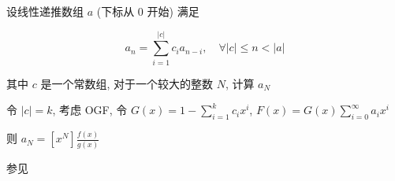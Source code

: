 设线性递推数组 \(a\) (下标从 \(0\) 开始) 满足

\[
    a_n=\sum_{i=1}^{|c|} c_i a_{n-i},\quad \forall |c|\leq n < |a|
\]

其中 \(c\) 是一个常数组, 对于一个较大的整数 \(N\), 计算 \(a_N\)

令 \(|c|=k\), 考虑 OGF, 令 \(\displaystyle G(x)=1-\sum_{i=1}^k c_ix^i\), \(\displaystyle F(x)=G(x)\sum_{i=0}^{\infty} a_ix^i\)

则 \(\displaystyle a_N=\left[x^N\right]\frac{f(x)}{g(x)}\)

参见 
